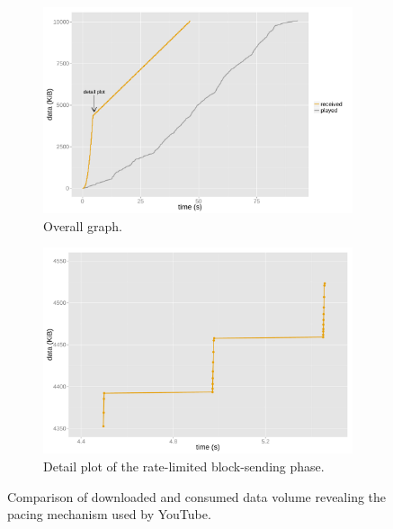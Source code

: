 \begin{figure}[htbp]
	\centering
	\begin{subfigure}[b]{0.9\textwidth}
		\centering
		\includegraphics[width=\textwidth]{images/R-blocktransfer.pdf}
		\caption{Overall graph.}
		\label{c3:fig:blocktransfer-overall}
	\end{subfigure}

	\begin{subfigure}[b]{0.9\textwidth}
		\centering
		\includegraphics[width=\textwidth]{images/R-blocktransferdetail.pdf}
		\caption{Detail plot of the rate-limited block-sending phase.}
		\label{c3:fig:blocktransfer-detail}
	\end{subfigure}
\caption{Comparison of downloaded and consumed data volume revealing the pacing mechanism used by YouTube.}
\label{c3:fig:blocktransfer}
\end{figure}

